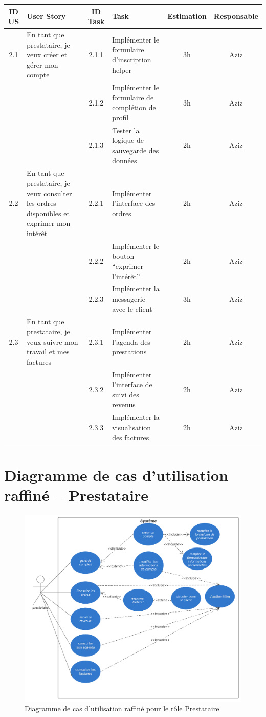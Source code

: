 \begin{center}
\begin{tabular}{|c|p{4.2cm}|c|p{4.5cm}|c|c|}
\hline
\textbf{ID US} & \textbf{User Story} & \textbf{ID Task} & \textbf{Task} & \textbf{Estimation} & \textbf{Responsable} \\
\hline
2.1 & En tant que prestataire, je veux créer et gérer mon compte & 2.1.1 & Implémenter le formulaire d’inscription helper & 3h & Aziz \\
\cline{3-6}
& & 2.1.2 & Implémenter le formulaire de complétion de profil & 3h & Aziz \\
\cline{3-6}
& & 2.1.3 & Tester la logique de sauvegarde des données & 2h & Aziz \\
\hline
2.2 & En tant que prestataire, je veux consulter les ordres disponibles et exprimer mon intérêt & 2.2.1 & Implémenter l’interface des ordres & 2h & Aziz \\
\cline{3-6}
& & 2.2.2 & Implémenter le bouton “exprimer l’intérêt” & 2h & Aziz \\
\cline{3-6}
& & 2.2.3 & Implémenter la messagerie avec le client & 3h & Aziz \\
\hline
2.3 & En tant que prestataire, je veux suivre mon travail et mes factures & 2.3.1 & Implémenter l’agenda des prestations & 2h & Aziz \\
\cline{3-6}
& & 2.3.2 & Implémenter l’interface de suivi des revenus & 2h & Aziz \\
\cline{3-6}
& & 2.3.3 & Implémenter la visualisation des factures & 2h & Aziz \\
\hline
\end{tabular}
\end{center}

\section*{Diagramme de cas d’utilisation raffiné – Prestataire}

\begin{figure}[H]
\centering
\includegraphics[width=0.8\linewidth]{figures/Diagramme de cas d'utilisation (1).png}
\caption{Diagramme de cas d’utilisation raffiné pour le rôle Prestataire}
\end{figure}

